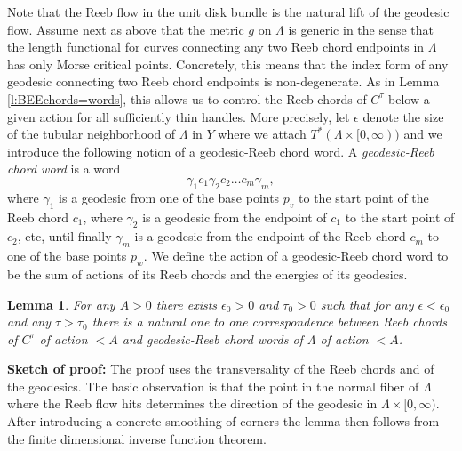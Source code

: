 \documentclass{gtpart}
\newtheorem{lem}[thm]{Lemma}
\begin{document}
Note that the Reeb flow in the unit disk bundle is the natural lift of the geodesic flow. Assume next as above that the metric $g$ on $\Lambda$ is generic in the sense that the length functional for curves connecting any two Reeb chord endpoints in $\Lambda$ has only Morse critical points. Concretely, this means that the index form of any geodesic connecting two Reeb chord endpoints is non-degenerate. As in Lemma \ref{l:BEEchords=words}, this allows us to control the Reeb chords of $C^{\tau}$ below a given action for all sufficiently thin handles. More precisely, let $\epsilon$ denote the size of the tubular neighborhood of $\Lambda$ in $Y$ where we attach $T^{\ast}(\Lambda\times [0,\infty))$ and we introduce the following notion of a geodesic-Reeb chord word. A \emph{geodesic-Reeb chord word} is a word
\[ 
\gamma_{1}c_{1}\gamma_{2}c_{2}\dots c_{m}\gamma_{m},
\] 
where $\gamma_{1}$ is a geodesic from one of the base points $p_{v}$ to the start point of the
Reeb chord $c_{1}$, where $\gamma_{2}$ is a geodesic from the endpoint of $c_{1}$ to the start point
of $c_{2}$, etc, until finally $\gamma_{m}$ is a geodesic from the endpoint of the Reeb chord
$c_{m}$ to one of the base points $p_w$. We define the action of a geodesic-Reeb chord word to be the sum of actions of its Reeb chords and the energies of its geodesics.


\begin{lem}\label{l:newchords=words}
	For any $A>0$ there exists $\epsilon_{0}>0$ and $\tau_{0}>0$ such that for any $\epsilon<\epsilon_{0}$ and any $\tau>\tau_{0}$ there is a natural one to one correspondence between Reeb chords of $C^{\tau}$ of action $<A$ and geodesic-Reeb chord words of $\Lambda$ of action $<A$.
\end{lem}

{\bf Sketch of proof:} The proof uses the transversality of the Reeb chords and of the geodesics. The basic observation is that the point in the normal fiber of $\Lambda$ where the Reeb flow hits determines the direction of the geodesic in $\Lambda\times[0,\infty)$. After introducing a concrete smoothing of corners the lemma then follows from the finite dimensional inverse function theorem. 
\end{document}
